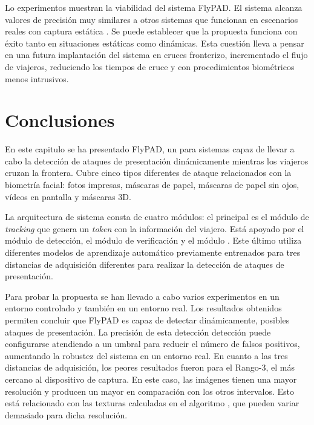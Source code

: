 Lo experimentos muestran la viabilidad del sistema \gls{FlyPAD}. El sistema alcanza valores de precisión muy similares a otros sistemas que funcionan en escenarios reales con captura estática \cite{komulainen2019review}. Se puede establecer que la propuesta funciona con éxito tanto en situaciones estáticas como dinámicas. Esta cuestión lleva a pensar en una futura implantación del sistema en cruces fronterizo, incrementado el flujo de viajeros, reduciendo los tiempos de cruce  y con procedimientos biométricos menos intrusivos.

\section{Conclusiones}\label{sec:ConclusuionesFlayPAD}

En este capitulo se ha presentado \gls{FlyPAD}, un  para sistemas  capaz de llevar a cabo la detección de ataques de presentación dinámicamente mientras los viajeros cruzan la frontera. Cubre cinco tipos diferentes de ataque relacionados con la biometría facial: fotos impresas, máscaras de papel, máscaras de papel sin ojos, vídeos en pantalla y máscaras $3$D. 

La arquitectura de sistema consta de cuatro módulos: el principal es el módulo de \textit{tracking} que genera un \textit{token} con la información del viajero. Está apoyado por el módulo de detección, el módulo de verificación y el módulo . Este último utiliza diferentes modelos de aprendizaje automático previamente entrenados para tres distancias de adquisición diferentes para realizar la detección de ataques de presentación.

Para probar la propuesta se han llevado a cabo varios experimentos en un entorno controlado y también en un entorno real. Los resultados obtenidos permiten concluir que \gls{FlyPAD} es capaz de detectar dinámicamente, posibles ataques de presentación. La precisión de esta detección detección puede configurarse atendiendo a un umbral para reducir el número de falsos positivos, aumentando la robustez del sistema en un entorno real. En cuanto a las tres distancias de adquisición, los peores resultados fueron para el Rango-3, el más cercano al dispositivo de captura. En este caso, las imágenes tienen una mayor resolución y producen un mayor  en comparación con los otros intervalos. Esto está relacionado con las texturas calculadas en el algoritmo , que pueden variar demasiado para dicha resolución.

